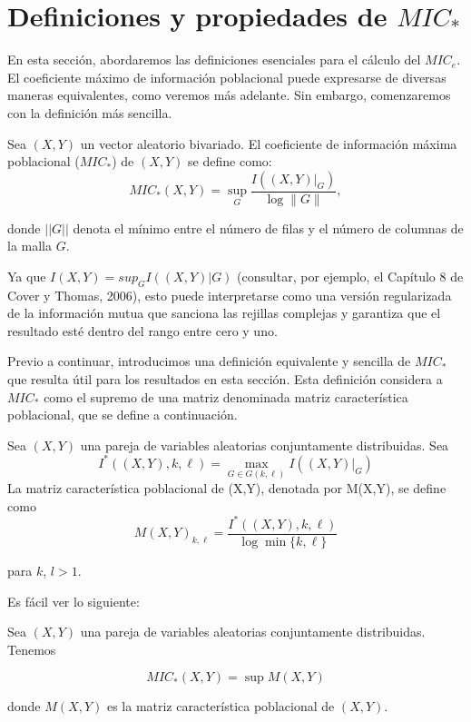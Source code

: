 	\section[short]{Definiciones y propiedades de $MIC_*$}

	En esta secci\'on, abordaremos las definiciones esenciales para el c\'alculo del $MIC_e$. El coeficiente m\'aximo de informaci\'on poblacional puede expresarse de diversas maneras equivalentes, como veremos m\'as adelante. Sin embargo, comenzaremos con la definici\'on m\'as sencilla.

	\begin{defn}
		Sea $(X,Y)$ un vector aleatorio bivariado. El coeficiente de informaci\'on m\'axima poblacional ($MIC_*$) de $(X,Y)$ se define como:
		$$
		M I C_*(X, Y)=\sup _G \frac{I\left(\left.(X, Y)\right|_G\right)}{\log \|G\|},
		$$
		
		donde $||G||$ denota el m\'inimo entre el n\'umero de filas y el n\'umero de columnas de la malla $G$.
	\end{defn}
	
	Ya que $I(X,Y) = sup_G I((X,Y)|G)$ (consultar, por ejemplo, el Cap\'itulo 8 de Cover y Thomas, 2006), esto puede interpretarse como una versi\'on regularizada de la informaci\'on mutua que sanciona las rejillas complejas y garantiza que el resultado est\'e dentro del rango entre cero y uno.
	
	Previo a continuar, introducimos una definici\'on equivalente y sencilla de $MIC_*$ que resulta \'util para los resultados en esta secci\'on. Esta definici\'on considera a $MIC_*$ como el supremo de una matriz denominada matriz caracter\'istica poblacional, que se define a continuaci\'on.
	
	\begin{defn}
		Sea $(X,Y)$ una pareja de variables aleatorias conjuntamente distribuidas. Sea
		$$
		I^*((X, Y), k, \ell)=\max _{G \in G(k, \ell)} I\left(\left.(X, Y)\right|_G\right)
		$$
		La matriz caracter\'istica poblacional de (X,Y), denotada por M(X,Y), se define como
		$$
		M(X, Y)_{k, \ell}=\frac{I^*((X, Y), k, \ell)}{\log \min \{k, \ell\}}
		$$
	\end{defn}
	
	para $k$, $l > 1$.
	
	Es f\'acil ver lo siguiente:

	\begin{prop}
		Sea $(X,Y)$ una pareja de variables aleatorias conjuntamente distribuidas. Tenemos
	
	$$MIC_*(X,Y) = \sup M(X,Y)$$
	
	donde $M(X,Y)$ es la matriz caracter\'istica poblacional de $(X,Y)$.
	\end{prop}	

